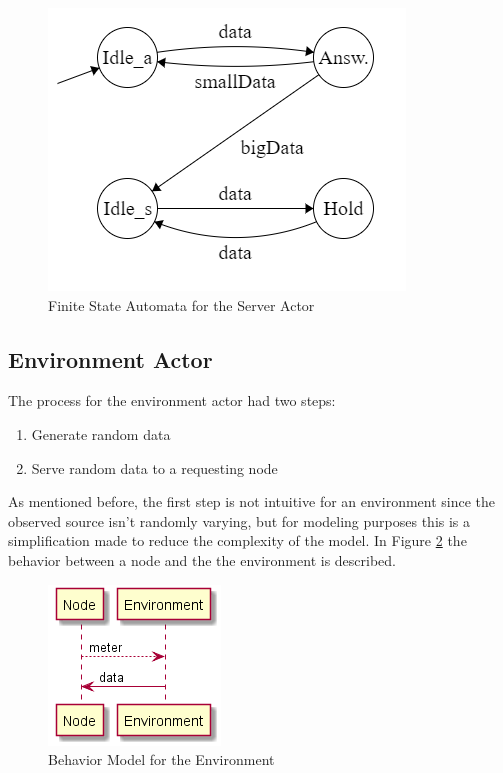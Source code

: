 \begin{figure}[ht]
    \includegraphics{include/figures/server_actor_fsm}
    \caption{Finite State Automata for the Server Actor}
    \label{fig:server_states}
\end{figure}

\subsection{Environment Actor}

The process for the environment actor had two steps:

\begin{enumerate}
\item Generate random data
\item Serve random data to a requesting node 
\end{enumerate}

As mentioned before, the first step is not intuitive for an environment since the observed source isn't randomly varying, but for modeling purposes this is a simplification made to reduce the complexity of the model. In Figure \ref{fig:behav_example} the behavior between a node and the the environment is described.


\begin{figure}[ht]
    \includegraphics[]{include/figures/env_behav}
    \caption{Behavior Model for the Environment}
    \label{fig:behav_example}
\end{figure}

